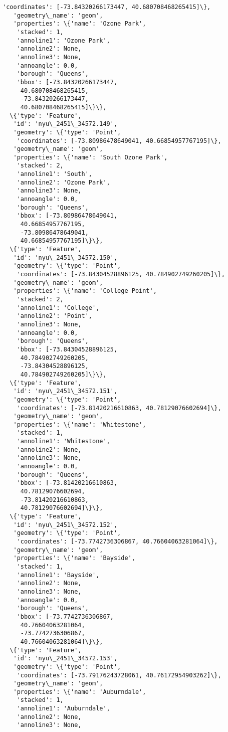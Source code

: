 \documentclass[11pt]{article}
\begin{document}
\begin{tcolorbox}[breakable, size=fbox, boxrule=.5pt, pad at break*=1mm, opacityfill=0]
\begin{Verbatim}[commandchars=\\\{\}]
    'coordinates': [-73.84320266173447, 40.680708468265415]\},
   'geometry\_name': 'geom',
   'properties': \{'name': 'Ozone Park',
    'stacked': 1,
    'annoline1': 'Ozone Park',
    'annoline2': None,
    'annoline3': None,
    'annoangle': 0.0,
    'borough': 'Queens',
    'bbox': [-73.84320266173447,
     40.680708468265415,
     -73.84320266173447,
     40.680708468265415]\}\},
  \{'type': 'Feature',
   'id': 'nyu\_2451\_34572.149',
   'geometry': \{'type': 'Point',
    'coordinates': [-73.80986478649041, 40.66854957767195]\},
   'geometry\_name': 'geom',
   'properties': \{'name': 'South Ozone Park',
    'stacked': 2,
    'annoline1': 'South',
    'annoline2': 'Ozone Park',
    'annoline3': None,
    'annoangle': 0.0,
    'borough': 'Queens',
    'bbox': [-73.80986478649041,
     40.66854957767195,
     -73.80986478649041,
     40.66854957767195]\}\},
  \{'type': 'Feature',
   'id': 'nyu\_2451\_34572.150',
   'geometry': \{'type': 'Point',
    'coordinates': [-73.84304528896125, 40.784902749260205]\},
   'geometry\_name': 'geom',
   'properties': \{'name': 'College Point',
    'stacked': 2,
    'annoline1': 'College',
    'annoline2': 'Point',
    'annoline3': None,
    'annoangle': 0.0,
    'borough': 'Queens',
    'bbox': [-73.84304528896125,
     40.784902749260205,
     -73.84304528896125,
     40.784902749260205]\}\},
  \{'type': 'Feature',
   'id': 'nyu\_2451\_34572.151',
   'geometry': \{'type': 'Point',
    'coordinates': [-73.81420216610863, 40.78129076602694]\},
   'geometry\_name': 'geom',
   'properties': \{'name': 'Whitestone',
    'stacked': 1,
    'annoline1': 'Whitestone',
    'annoline2': None,
    'annoline3': None,
    'annoangle': 0.0,
    'borough': 'Queens',
    'bbox': [-73.81420216610863,
     40.78129076602694,
     -73.81420216610863,
     40.78129076602694]\}\},
  \{'type': 'Feature',
   'id': 'nyu\_2451\_34572.152',
   'geometry': \{'type': 'Point',
    'coordinates': [-73.7742736306867, 40.76604063281064]\},
   'geometry\_name': 'geom',
   'properties': \{'name': 'Bayside',
    'stacked': 1,
    'annoline1': 'Bayside',
    'annoline2': None,
    'annoline3': None,
    'annoangle': 0.0,
    'borough': 'Queens',
    'bbox': [-73.7742736306867,
     40.76604063281064,
     -73.7742736306867,
     40.76604063281064]\}\},
  \{'type': 'Feature',
   'id': 'nyu\_2451\_34572.153',
   'geometry': \{'type': 'Point',
    'coordinates': [-73.79176243728061, 40.76172954903262]\},
   'geometry\_name': 'geom',
   'properties': \{'name': 'Auburndale',
    'stacked': 1,
    'annoline1': 'Auburndale',
    'annoline2': None,
    'annoline3': None,

\end{Verbatim}
\end{tcolorbox}
\end{document}
